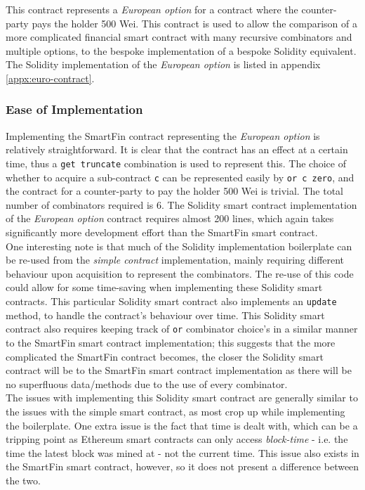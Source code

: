 This contract represents a \textit{European option} for a contract where the counter-party pays the holder 500 Wei. This contract is used to allow the comparison of a more complicated financial smart contract with many recursive combinators and multiple options, to the bespoke implementation of a bespoke Solidity equivalent. The Solidity implementation of the \textit{European option} is listed in appendix \ref{appx:euro-contract}.


\subsubsection{Ease of Implementation}

Implementing the SmartFin contract representing the \textit{European option} is relatively straightforward. It is clear that the contract has an effect at a certain time, thus a \texttt{get truncate} combination is used to represent this. The choice of whether to acquire a sub-contract \texttt{c} can be represented easily by \texttt{or c zero}, and the contract for a counter-party to pay the holder 500 Wei is trivial. The total number of combinators required is 6. The Solidity smart contract implementation of the \textit{European option} contract requires almost 200 lines, which again takes significantly more development effort than the SmartFin smart contract. \\

One interesting note is that much of the Solidity implementation boilerplate can be re-used from the \textit{simple contract} implementation, mainly requiring different behaviour upon acquisition to represent the combinators. The re-use of this code could allow for some time-saving when implementing these Solidity smart contracts. This particular Solidity smart contract also implements an \texttt{update} method, to handle the contract's behaviour over time. This Solidity smart contract also requires keeping track of \texttt{or} combinator choice's in a similar manner to the SmartFin smart contract implementation; this suggests that the more complicated the SmartFin contract becomes, the closer the Solidity smart contract will be to the SmartFin smart contract implementation as there will be no superfluous data/methods due to the use of every combinator. \\

The issues with implementing this Solidity smart contract are generally similar to the issues with the simple smart contract, as most crop up while implementing the boilerplate. One extra issue is the fact that time is dealt with, which can be a tripping point as Ethereum smart contracts can only access \textit{block-time} - i.e. the time the latest block was mined at - not the current time. This issue also exists in the SmartFin smart contract, however, so it does not present a difference between the two.


